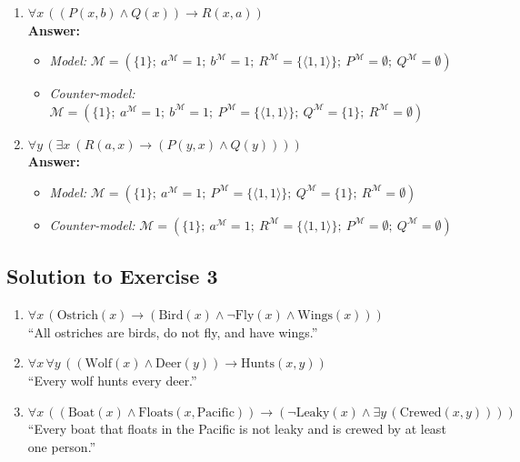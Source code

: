 \documentclass[11pt]{article}
\begin{document}
    \begin{enumerate}
        \item $\forall x\,((P(x, b) \wedge Q(x)) \rightarrow R(x, a))$\\
        \textbf{Answer:}
        \begin{itemize}
            \item \textit{Model:}
            $\mathcal{M} = (\{1\};\ a^\mathcal{M} = 1;\ b^\mathcal{M} = 1;\ R^\mathcal{M} = \{\langle 1, 1 \rangle\};\ P^\mathcal{M} = \emptyset;\ Q^\mathcal{M} = \emptyset)$
            \item \textit{Counter-model:}
            $\mathcal{M} = (\{1\};\ a^\mathcal{M} = 1;\ b^\mathcal{M} = 1;\ P^\mathcal{M} = \{\langle 1, 1 \rangle\};\ Q^\mathcal{M} = \{1\};\ R^\mathcal{M} = \emptyset)$
        \end{itemize}

        \item $\forall y\,(\exists x\ (R(a, x) \rightarrow (P(y, x) \wedge Q(y))))$\\
        \textbf{Answer:}
        \begin{itemize}
            \item \textit{Model:}
            $\mathcal{M} = (\{1\};\ a^\mathcal{M} = 1;\ P^\mathcal{M} = \{\langle 1, 1 \rangle\};\ Q^\mathcal{M} = \{1\};\ R^\mathcal{M} = \emptyset)$
            \item \textit{Counter-model:}
            $\mathcal{M} = (\{1\};\ a^\mathcal{M} = 1;\ R^\mathcal{M} = \{\langle 1, 1 \rangle\};\ P^\mathcal{M} = \emptyset;\ Q^\mathcal{M} = \emptyset)$
        \end{itemize}
    \end{enumerate}

    \subsection{Solution to Exercise 3}\label{subsec:solution-to-exercise-3}

    \begin{enumerate}
        \item $\forall x\, (\text{Ostrich}(x) \rightarrow (\text{Bird}(x) \wedge \neg \text{Fly}(x) \wedge \text{Wings}(x)))$\\[1ex]
        ``All ostriches are birds, do not fly, and have wings.''

        \item $\forall x\, \forall y\, ((\text{Wolf}(x) \wedge \text{Deer}(y)) \rightarrow \text{Hunts}(x, y))$\\[1ex]
        ``Every wolf hunts every deer.''

        \item $\forall x\, ((\text{Boat}(x) \wedge \text{Floats}(x, \text{Pacific})) \rightarrow (\neg\text{Leaky}(x) \wedge \exists y\, (\text{Crewed}(x, y))))$\\[1ex]
        ``Every boat that floats in the Pacific is not leaky and is crewed by at least one person.''
    \end{enumerate}
\end{document}

